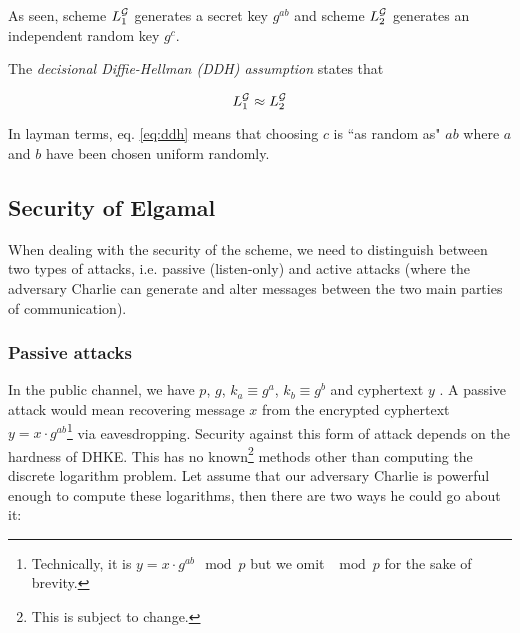As seen, scheme \( L_1^{\mathcal{G}} \) generates a secret key \( g^{ab} \) and scheme \( L_2^{\mathcal{G}} \) generates an independent random key \( g^c \).

The \textit{decisional Diffie-Hellman (DDH) assumption} states that

\begin{equation} \label{eq:ddh} 
    L_1^{\mathcal{G}} \approx L_2^{\mathcal{G}}
\end{equation}

In layman terms, eq. \ref{eq:ddh} means that choosing \( c \) is ``as random as" \( ab \) where \( a \) and \( b \) have been chosen uniform randomly.

\subsection{Security of Elgamal}

When dealing with the security of the scheme, we need to distinguish between two types of attacks, i.e. passive (listen-only) and active attacks (where the adversary Charlie can generate and alter messages between the two main parties of communication).

\subsubsection{Passive attacks}

In the public channel, we have \( p \), \( g \), \( k_a \equiv g^a \), \( k_b \equiv g^b \) and cyphertext \( y \) . A passive attack would mean recovering message \( x \) from the encrypted cyphertext \( y = x \cdot g^{ab} \)\footnote{Technically, it is \( y = x \cdot g^{ab} \mod p \) but we omit \( \mod p \) for the sake of brevity.} via eavesdropping.
Security against this form of attack depends on the hardness of DHKE. 
This has no known\footnote{This is subject to change.} methods other than computing the discrete logarithm problem.
Let assume that our adversary Charlie is powerful enough to compute these logarithms, then there are two ways he could go about it:

